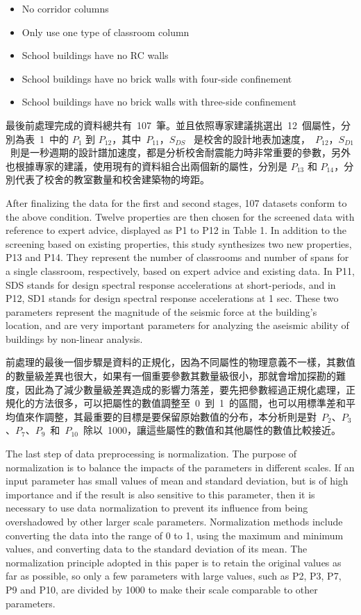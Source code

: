 \begin{itemize}
\item No corridor columns
\item Only use one type of classroom column
\item School buildings have no RC walls
\item School buildings have no brick walls with four-side confinement
\item School buildings have no brick walls with three-side confinement
\end{itemize}

最後前處理完成的資料總共有~107~筆。並且依照專家建議挑選出~12~個屬性，分別為表~1~中的 $P_1$ 到 $P_{12}$，其中~$P_{11}$，$S_{DS}$~ 是校舍的設計地表加速度，~$P_{12}$，$S_{D1}$~則是一秒週期的設計譜加速度，都是分析校舍耐震能力時非常重要的參數，另外也根據專家的建議，使用現有的資料組合出兩個新的屬性，分別是 $P_{13}$ 和 $P_{14}$，分別代表了校舍的教室數量和校舍建築物的垮距。

After finalizing the data for the first and second stages, 107 datasets conform to the above condition. Twelve properties are then chosen for the screened data with reference to expert advice, displayed as P1 to P12 in Table 1. In addition to the screening based on existing properties, this study synthesizes two new properties, P13 and P14. They represent the number of classrooms and number of spans for a single classroom, respectively, based on expert advice and existing data. In P11, SDS stands for design spectral response accelerations at short-periods, and in P12, SD1 stands for design spectral response accelerations at 1 sec. These two parameters represent the magnitude of the seismic force at the building’s location, and are very important parameters for analyzing the aseismic ability of buildings by non-linear analysis.

前處理的最後一個步驟是資料的正規化，因為不同屬性的物理意義不一樣，其數值的數量級差異也很大，如果有一個重要參數其數量級很小，那就會增加探勘的難度，因此為了減少數量級差異造成的影響力落差，要先把參數經過正規化處理，正規化的方法很多，可以把屬性的數值調整至~0~到~1~的區間，也可以用標準差和平均值來作調整，其最重要的目標是要保留原始數值的分布，本分析則是對~$P_2$、$P_3$、$P_7$、$P_9$~和~$P_{10}$~除以~1000，讓這些屬性的數值和其他屬性的數值比較接近。

The last step of data preprocessing is normalization. The purpose of normalization is to balance the impacts of the parameters in different scales. If an input parameter has small values of mean and standard deviation, but is of high importance and if the result is also sensitive to this parameter, then it is necessary to use data normalization to prevent its influence from being overshadowed by other larger scale parameters. Normalization methods include converting the data into the range of 0 to 1, using the maximum and minimum values, and converting data to the standard deviation of its mean. The normalization principle adopted in this paper is to retain the original values as far as possible, so only a few parameters with large values, such as P2, P3, P7, P9 and P10, are divided by 1000 to make their scale comparable to other parameters.

